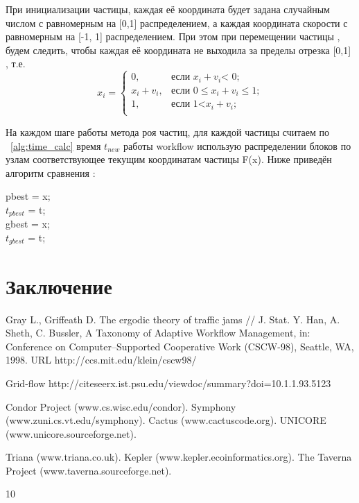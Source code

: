 \documentclass[a4paper,12pt]{article}
\begin{document}
При инициализации частицы, каждая её координата будет задана случайным числом с равномерным на [0,1] распределением, а каждая координата скорости с равномерным на [-1, 1] распределением. При этом при перемещении частицы , будем следить, чтобы каждая её координата не выходила за пределы отрезка [0,1] , т.е. 
$$x_{i}=
\begin{cases}
0,&\text{если $x_{i} + v_{i}$< 0;}\\
x_{i} + v_{i},&\text{если 0$\leq x_{i} + v_{i}\leq$1;}\\
1,&\text{если 1<$x_{i} + v_{i}$;}\\
\end{cases}
$$



На каждом шаге работы метода роя частиц, для каждой частицы считаем по ~\cref{alg:time_calc} время $t_{new}$ работы workflow  использую распределении блоков по узлам соответствующее текущим координатам частицы F(x). Ниже приведён алгоритм сравнения :
\begin{algorithm}
 {
	pbest = x;\\	$t_{pbest}$ = t;\\
	 {
	gbest = x;\\
	$t_{gbest}$ = t;\\
	}
}

\label{alg:time_calc}
\end{algorithm}

\section{Заключение}




\begin{thebibliography}{10}
 Gray L., Griffeath D. The ergodic theory of traffic jams // J. Stat. 
 Y. Han, A. Sheth, C. Bussler, A Taxonomy of Adaptive Workflow Management, in:
Conference on Computer–Supported Cooperative Work (CSCW-98), Seattle, WA,
1998.
URL http://ccs.mit.edu/klein/cscw98/


Grid-flow http://citeseerx.ist.psu.edu/viewdoc/summary?doi=10.1.1.93.5123

 Condor Project (www.cs.wisc.edu/condor).
 Symphony (www.zuni.cs.vt.edu/symphony).
 Cactus (www.cactuscode.org).
 UNICORE (www.unicore.sourceforge.net).


 Triana (www.triana.co.uk).
 Kepler (www.kepler.ecoinformatics.org).
 The Taverna Project (www.taverna.sourceforge.net).



\end{thebibliography}{10}
\end{document}
